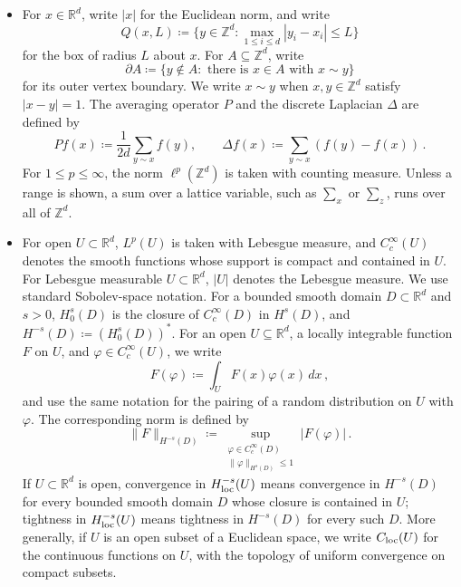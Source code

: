 \documentclass[11pt]{amsart}
\theoremstyle{plain}
\theoremstyle{definition}
\newcommand{\Z}{\mathbb{Z}}
\newcommand{\R}{\mathbb{R}}
\begin{document}
\begin{itemize}
    \item  For $x\in\R^d$, write $|x|$ for the Euclidean norm, and write
    \[
        Q(x,L)\coloneqq \{y\in\Z^d:\max_{1\leq i\leq d}|y_i-x_i|\leq L\}
    \]
    for the box of radius $L$ about $x$.
    For $A\subseteq\Z^d$, write
    \[
        \partial A\coloneqq\{y\notin A:\text{ there is }x\in A\text{ with }x\sim y\}
    \]
    for its outer vertex boundary.
    We write $x\sim y$ when $x,y\in\Z^d$ satisfy $|x-y|=1$. The averaging
    operator $P$ and the discrete Laplacian $\Delta$ are defined by
    \[
        Pf(x)\coloneqq\frac1{2d}\sum_{y\sim x}f(y),\qquad
        \Delta f(x)\coloneqq\sum_{y\sim x}(f(y)-f(x))\, .
    \]
    For $1\leq p\leq\infty$, the norm $\ell^p(\Z^d)$ is taken with counting measure.
	    Unless a range is shown, a sum over a lattice variable, such as $\sum_x$ or
	    $\sum_z$, runs over all of $\Z^d$.

    \item For open $U\subset\R^d$, $L^p(U)$ is taken with Lebesgue measure, and
    $C_c^\infty(U)$ denotes the smooth functions whose support is compact and
    contained in $U$. For Lebesgue measurable $U\subset\R^d$, $|U|$ denotes
    the Lebesgue measure. We use standard Sobolev-space
	    notation. For a bounded smooth
	    domain $D\subset\R^d$ and $s>0$, $H_0^s(D)$ is the closure of
	    $C_c^\infty(D)$ in $H^s(D)$, and
	    $H^{-s}(D)\coloneqq (H_0^s(D))^*$. For an open $U\subseteq\R^d$, a locally
	    integrable function $F$ on $U$, and $\varphi\in C_c^\infty(U)$, we write
	    \[
	        F(\varphi)\coloneqq\int_U F(x)\varphi(x)\,dx\, ,
	    \]
	    and use the same notation for the pairing of a random distribution on $U$
	    with $\varphi$.
	    The corresponding norm is defined by
    \[
        \|F\|_{H^{-s}(D)}
        \coloneqq 
        \sup_{\substack{\varphi\in C_c^\infty(D)\\ \|\varphi\|_{H^s(D)}\leq1}}
        |F(\varphi)|\, .
    \]
    If $U\subset\R^d$ is open, convergence in $H^{-s}_{\rm loc}(U)$ means
    convergence in $H^{-s}(D)$ for every bounded smooth domain $D$ whose
    closure is contained in $U$; tightness in $H^{-s}_{\rm loc}(U)$ means
    tightness in $H^{-s}(D)$ for every such $D$.
	    More generally, if $U$ is an open subset of a Euclidean space, we write
	    $C_{\rm loc}(U)$ for the continuous functions on $U$, with the topology of
	    uniform convergence on compact subsets.


\end{itemize}
\end{document}
